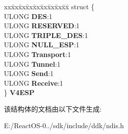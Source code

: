 \begin{DoxyCompactItemize}
\begin{tabbing}
\end{tabbing}\item 
\mbox{\label{struct___n_d_i_s___t_a_s_k___i_p_s_e_c_a2b7a2aaf3f9f3a1154449e121fbdfdd0}} 
\begin{tabbing}
xx\=xx\=xx\=xx\=xx\=xx\=xx\=xx\=xx\=\kill
struct \{\\
\>ULONG {\bfseries DES}:1\\
\>ULONG {\bfseries RESERVED}:1\\
\>ULONG {\bfseries TRIPLE\_DES}:1\\
\>ULONG {\bfseries NULL\_ESP}:1\\
\>ULONG {\bfseries Transport}:1\\
\>ULONG {\bfseries Tunnel}:1\\
\>ULONG {\bfseries Send}:1\\
\>ULONG {\bfseries Receive}:1\\
\} {\bfseries V4ESP}\\

\end{tabbing}\end{DoxyCompactItemize}


该结构体的文档由以下文件生成\+:\begin{DoxyCompactItemize}
\item 
E\+:/\+React\+O\+S-\/0../sdk/include/ddk/ndis.\+h\end{DoxyCompactItemize}
